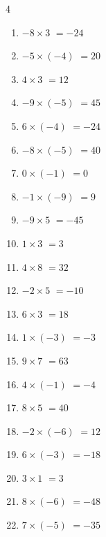 \begin{multicols}{4}
\begin{enumerate}
  \item $-8\times 3$
        $=-24$

  \item $-5\times (-4)$
        $=20$

  \item $4\times 3$
        $=12$

  \item $-9\times (-5)$
        $=45$

  \item $6\times (-4)$
        $=-24$

  \item $-8\times (-5)$
        $=40$

  \item $0\times (-1)$
        $=0$

  \item $-1\times (-9)$
        $=9$

\columnbreak %

  \item $-9\times 5$
        $=-45$

  \item $1\times 3$
        $=3$

  \item $4\times 8$
        $=32$

  \item $-2\times 5$
        $=-10$

  \item $6\times 3$
        $=18$

  \item $1\times (-3)$
        $=-3$

  \item $9\times 7$
        $=63$

  \item $4\times (-1)$
        $=-4$

  \item $8\times 5$
        $=40$

  \item $-2\times (-6)$
        $=12$

  \item $6\times (-3)$
        $=-18$

  \item $3\times 1$
        $=3$

  \item $8\times (-6)$
        $=-48$

  \item $7\times (-5)$
        $=-35$


\end{enumerate}
\end{multicols}

